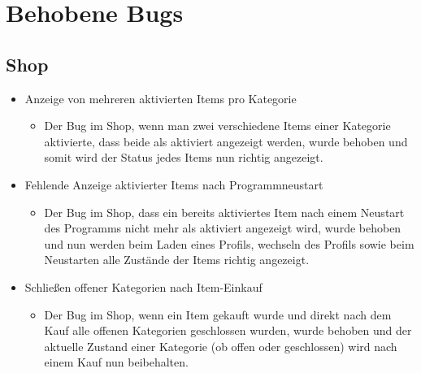 \section{Behobene Bugs}
\subsection{Shop}
\begin{itemize}
\item Anzeige von mehreren aktivierten Items pro Kategorie
\begin{itemize} 
\item Der Bug im Shop, wenn man zwei verschiedene Items einer Kategorie aktivierte, dass beide als aktiviert angezeigt werden, wurde behoben
	und somit wird der Status jedes Items nun richtig angezeigt.
	\end{itemize}
\end{itemize}

\begin{itemize}
\item Fehlende Anzeige aktivierter Items nach Programmneustart
\begin{itemize} 
\item Der Bug im Shop, dass ein bereits aktiviertes Item nach einem Neustart des Programms nicht mehr als aktiviert angezeigt wird, wurde behoben
	und nun werden beim Laden eines Profils, wechseln des Profils sowie beim Neustarten alle Zustände der Items richtig angezeigt.
	\end{itemize}
\end{itemize}

\begin{itemize}
\item Schließen offener Kategorien nach Item-Einkauf
\begin{itemize} 
\item Der Bug im Shop, wenn ein Item gekauft wurde und direkt nach dem Kauf alle offenen Kategorien geschlossen wurden, wurde behoben und
	der aktuelle Zustand einer Kategorie (ob offen oder geschlossen) wird nach einem Kauf nun beibehalten.
	\end{itemize}
\end{itemize}